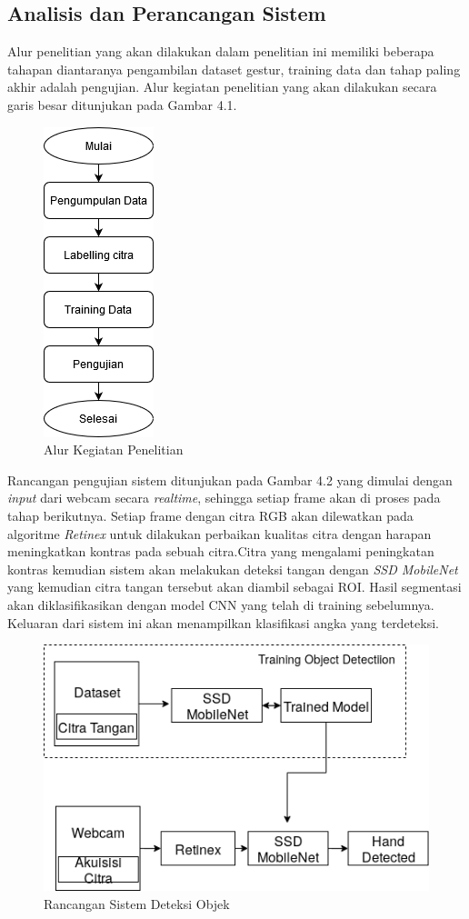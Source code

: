 \subsection{Analisis dan Perancangan Sistem}
Alur penelitian yang akan dilakukan dalam penelitian ini memiliki beberapa tahapan diantaranya pengambilan dataset gestur, training data dan tahap paling akhir adalah pengujian. Alur kegiatan penelitian yang akan dilakukan secara garis besar ditunjukan pada Gambar 4.1.
\begin{figure}[H]
	\centering
	\includegraphics[width=0.18\linewidth]{Rencana}
	\caption{Alur Kegiatan Penelitian}
	\label{fig:screenshot006}
\end{figure}
Rancangan pengujian sistem ditunjukan pada Gambar 4.2 yang dimulai dengan \emph{input} dari webcam secara \emph{realtime}, sehingga setiap frame akan di proses pada tahap berikutnya.
Setiap frame dengan citra RGB akan dilewatkan pada algoritme \emph{Retinex} untuk dilakukan perbaikan kualitas citra dengan harapan meningkatkan kontras pada sebuah citra.Citra yang mengalami peningkatan kontras kemudian sistem akan melakukan deteksi tangan dengan \emph{SSD MobileNet} yang kemudian citra tangan tersebut akan diambil sebagai ROI. 
Hasil segmentasi akan diklasifikasikan dengan model CNN yang telah di training sebelumnya.
Keluaran dari sistem ini akan menampilkan klasifikasi angka yang terdeteksi.
\begin{figure}[H]
	\centering
	\includegraphics[width=0.64\linewidth]{objectdtc}
	\caption{Rancangan Sistem Deteksi Objek}
	\label{fig:objectdtc}
\end{figure}
